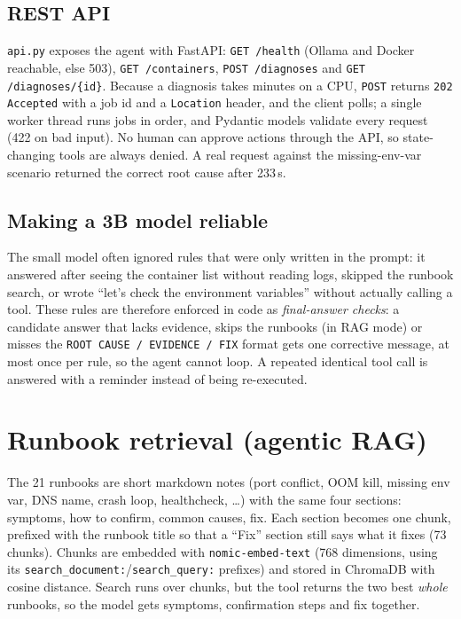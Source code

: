 \documentclass[10pt,a4paper]{article}
\newcommand{\code}[1]{\texttt{#1}}
\begin{document}
\subsection{REST API}
\code{api.py} exposes the agent with FastAPI: \code{GET /health} (Ollama and Docker reachable, else 503),
\code{GET /containers}, \code{POST /diagnoses} and \code{GET /diagnoses/\{id\}}. Because a diagnosis takes
minutes on a CPU, \code{POST} returns \code{202 Accepted} with a job id and a \code{Location} header, and the
client polls; a single worker thread runs jobs in order, and Pydantic models validate every request (422 on bad
input). No human can approve actions through the API, so state-changing tools are always denied. A real request
against the missing-env-var scenario returned the correct root cause after 233\,s.

\subsection{Making a 3B model reliable}
The small model often ignored rules that were only written in the prompt: it answered after
seeing the container list without reading logs, skipped the runbook search, or wrote
``let's check the environment variables'' without actually calling a tool. These rules are
therefore enforced in code as \emph{final-answer checks}: a candidate answer that lacks evidence,
skips the runbooks (in RAG mode) or misses the \code{ROOT CAUSE / EVIDENCE / FIX} format gets one
corrective message, at most once per rule, so the agent cannot loop. A repeated identical tool call
is answered with a reminder instead of being re-executed.

\section{Runbook retrieval (agentic RAG)}
The 21 runbooks are short markdown notes (port conflict, OOM kill, missing env var, DNS name,
crash loop, healthcheck, \dots) with the same four sections: symptoms, how to confirm, common causes,
fix. Each section becomes one chunk, prefixed with the runbook title so that a ``Fix'' section still
says what it fixes (73 chunks). Chunks are embedded with \code{nomic-embed-text} (768 dimensions,
using its \code{search\_document:}/\code{search\_query:} prefixes) and stored in ChromaDB with
cosine distance. Search runs over chunks, but the tool returns the two best \emph{whole} runbooks,
so the model gets symptoms, confirmation steps and fix together.
\end{document}
